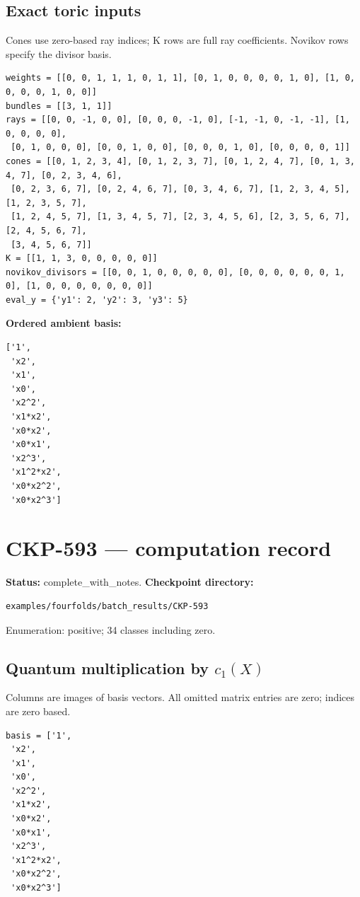 \documentclass[10pt,a4paper]{article}
\begin{document}
\subsection*{Exact toric inputs}
Cones use zero-based ray indices; K rows are full ray coefficients. Novikov rows specify the divisor basis.

\begin{lstlisting}
weights = [[0, 0, 1, 1, 1, 0, 1, 1], [0, 1, 0, 0, 0, 0, 1, 0], [1, 0, 0, 0, 0, 1, 0, 0]]
bundles = [[3, 1, 1]]
rays = [[0, 0, -1, 0, 0], [0, 0, 0, -1, 0], [-1, -1, 0, -1, -1], [1, 0, 0, 0, 0],
 [0, 1, 0, 0, 0], [0, 0, 1, 0, 0], [0, 0, 0, 1, 0], [0, 0, 0, 0, 1]]
cones = [[0, 1, 2, 3, 4], [0, 1, 2, 3, 7], [0, 1, 2, 4, 7], [0, 1, 3, 4, 7], [0, 2, 3, 4, 6],
 [0, 2, 3, 6, 7], [0, 2, 4, 6, 7], [0, 3, 4, 6, 7], [1, 2, 3, 4, 5], [1, 2, 3, 5, 7],
 [1, 2, 4, 5, 7], [1, 3, 4, 5, 7], [2, 3, 4, 5, 6], [2, 3, 5, 6, 7], [2, 4, 5, 6, 7],
 [3, 4, 5, 6, 7]]
K = [[1, 1, 3, 0, 0, 0, 0, 0]]
novikov_divisors = [[0, 0, 1, 0, 0, 0, 0, 0], [0, 0, 0, 0, 0, 0, 1, 0], [1, 0, 0, 0, 0, 0, 0, 0]]
eval_y = {'y1': 2, 'y2': 3, 'y3': 5}
\end{lstlisting}

\textbf{Ordered ambient basis:}
\begin{lstlisting}
['1',
 'x2',
 'x1',
 'x0',
 'x2^2',
 'x1*x2',
 'x0*x2',
 'x0*x1',
 'x2^3',
 'x1^2*x2',
 'x0*x2^2',
 'x0*x2^3']
\end{lstlisting}

\clearpage\section*{CKP-593 --- computation record}
\textbf{Status:} complete\_with\_notes.
\textbf{Checkpoint directory:}
\begin{lstlisting}
examples/fourfolds/batch_results/CKP-593
\end{lstlisting}

Enumeration: positive; 34 classes including zero.
\subsection*{Quantum multiplication by $c_1(X)$}
Columns are images of basis vectors. All omitted matrix entries are zero; indices are zero based.

\begin{lstlisting}
basis = ['1',
 'x2',
 'x1',
 'x0',
 'x2^2',
 'x1*x2',
 'x0*x2',
 'x0*x1',
 'x2^3',
 'x1^2*x2',
 'x0*x2^2',
 'x0*x2^3']
\end{lstlisting}
\end{document}
